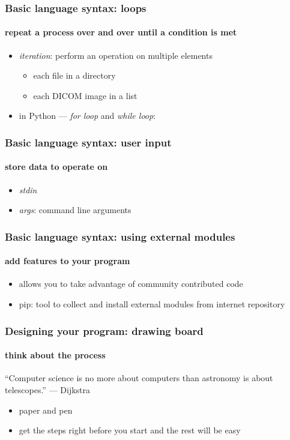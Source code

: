 \documentclass{beamer}
\begin{document}
    \begin{frame}
	    \frametitle{Basic language syntax: loops}
	    \framesubtitle{repeat a process over and over until a condition is met}
	    \begin{itemize}
		    \item \textit{iteration}: perform an operation on multiple elements
			    \begin{itemize}
				    \item each file in a directory
				    \item each DICOM image in a list
			    \end{itemize}
		    \item in Python --- \textit{for loop} and \textit{while loop}:
	    \end{itemize}
	    \lstJ
    \end{frame}

    \begin{frame}
	    \frametitle{Basic language syntax: user input}
	    \framesubtitle{store data to operate on}
	    \begin{itemize}
		    \item \textit{stdin}
		    \item \textit{args}: command line arguments
	    \end{itemize}
    \end{frame}


    \begin{frame}
	    \frametitle{Basic language syntax: using external modules}
	    \framesubtitle{add features to your program}
	    \begin{itemize}
		    \item allows you to take advantage of community contributed code
		    \item pip: tool to collect and install external modules from internet repository
	    \end{itemize}
    \end{frame}

    \begin{frame}
	    \frametitle{Designing your program: drawing board}
	    \framesubtitle{think about the process}
		    ``Computer science is no more about computers than astronomy is about telescopes.'' --- Dijkstra
	    \begin{itemize}
		    \item paper and pen
		    \item get the steps right before you start and the rest will be easy
	    \end{itemize}
    \end{frame}
\end{document}
